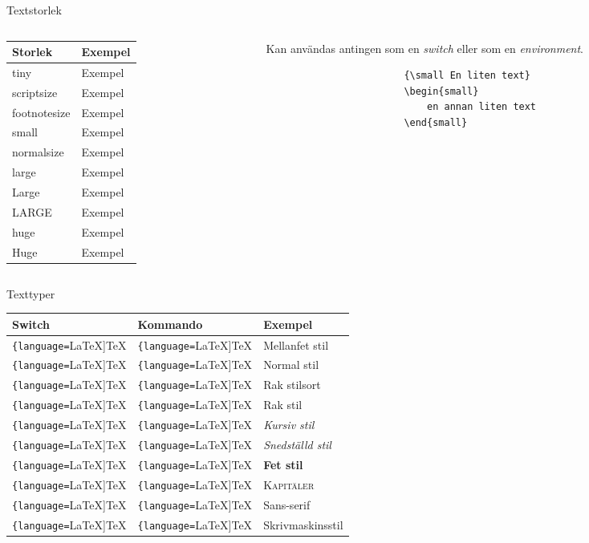 \documentclass[xcolor=x11names,compress,swedish]{beamer}
\newcommand*{\Lcode}{\lstinline[{language=[LaTeX]TeX}]}
\begin{document}
		\begin{frame}[fragile]{Textstorlek}
			\begin{columns}[t]
				\begin{column}{0.5\textwidth}
					\begin{tabular}{ll}
						Storlek		& 	Exempel\\ \toprule
						tiny		&	{\tiny Exempel}\	&	{\scriptsize Exempel}\ &	{\footnotesize Exempel}\		&	{\small Exempel}\	&	{\normalsize Exempel}\		&	{\large Exempel}\		&	{\Large Exempel}\		&	{\LARGE Exempel}\		&	{\huge Exempel}\		&	{\Huge Exempel}
					\end{tabular}
				\end{column}
				\begin{column}{0.4\textwidth}
					Kan användas antingen som en \emph{switch} eller som en \emph{environment}.
					{\small
					\begin{lstlisting}
						{\small En liten text}
						\begin{small}
							en annan liten text
						\end{small}
					\end{lstlisting}
					}
				\end{column}
			\end{columns}
		\end{frame}
		
		\begin{frame}[fragile]{Texttyper}
			\begin{tabular}{lll}
				Switch				& Kommando			& Exempel \\ \toprule
				\Lcode|\mdseries|	& \Lcode|\textmd|	& {\libertine\mdseries Mellanfet stil}\\
				\Lcode|\normalfont| & \Lcode|\textnormal| & {\libertine Normal stil}\\
				\Lcode|\rmfamily|	& \Lcode|\textrm|	& {\libertine Rak stilsort}\\
				\Lcode|\upshape|	& \Lcode|\textup|	& {\libertine\upshape Rak stil}\\
				\Lcode|\itshape|	& \Lcode|\textit|	& {\libertine\itshape Kursiv stil}\\
				\Lcode|\slshape|	& \Lcode|\textsl|	& {\libertine\slshape Snedställd stil}\\
				\Lcode|\bfseries|	& \Lcode|\textbf|	& {\libertine\bfseries Fet stil}\\
				\Lcode|\scshape|	& \Lcode|\textsc|	& {\libertine\scshape Kapitäler}\\
				\Lcode|\sffamily|	& \Lcode|\textsf|	& {\sffamily Sans-serif}\\
				\Lcode|\ttfamily|	& \Lcode|\texttt|	& {\ttfamily Skrivmaskinsstil}
			\end{tabular}
		\end{frame}
		
\end{document}
